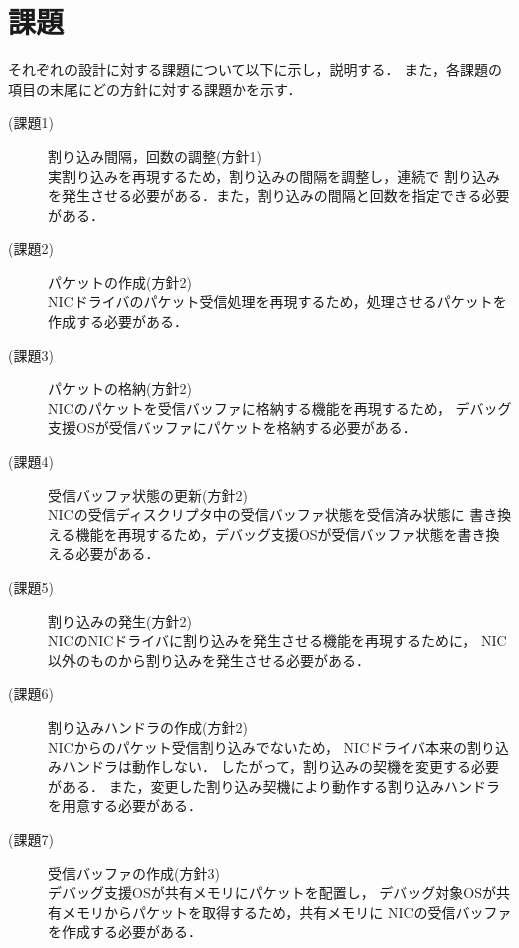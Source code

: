 \documentclass[tanilab-enum]{graduate}
\begin{document}
\section{課題}\label{kadai}
それぞれの設計に対する課題について以下に示し，説明する．
また，各課題の項目の末尾にどの方針に対する課題かを示す．
\begin{description}
    \item[(課題1)] 割り込み間隔，回数の調整(方針1)\\
        実割り込みを再現するため，割り込みの間隔を調整し，連続で
        割り込みを発生させる必要がある．また，割り込みの間隔と回数を指定できる必要がある．
    \item[(課題2)] パケットの作成(方針2)\\
        NICドライバのパケット受信処理を再現するため，処理させるパケットを
        作成する必要がある．
    \item[(課題3)] パケットの格納(方針2)\\
        NICのパケットを受信バッファに格納する機能を再現するため，
        デバッグ支援OSが受信バッファにパケットを格納する必要がある．
    \item[(課題4)] 受信バッファ状態の更新(方針2)\\
        NICの受信ディスクリプタ中の受信バッファ状態を受信済み状態に
        書き換える機能を再現するため，デバッグ支援OSが受信バッファ状態を書き換える必要がある．
    \item[(課題5)] 割り込みの発生(方針2)\\
        NICのNICドライバに割り込みを発生させる機能を再現するために，
        NIC以外のものから割り込みを発生させる必要がある．
    \item[(課題6)] 割り込みハンドラの作成(方針2)\\
        NICからのパケット受信割り込みでないため，
        NICドライバ本来の割り込みハンドラは動作しない．
        したがって，割り込みの契機を変更する必要がある．
        また，変更した割り込み契機により動作する割り込みハンドラを用意する必要がある．
    \item[(課題7)] 受信バッファの作成(方針3)\\
        デバッグ支援OSが共有メモリにパケットを配置し，
        デバッグ対象OSが共有メモリからパケットを取得するため，共有メモリに
        NICの受信バッファを作成する必要がある．
\end{description}
\end{document}
